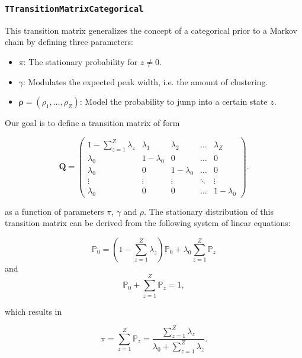 \documentclass[a4paper,11pt]{article}
\def\Q{\boldsymbol{Q}}
\def\brho{\boldsymbol{\rho}}
\def\p{\mathbb{P}}
\newcommand{\class}[1]{\texttt{#1}}
\begin{document}
\subsubsection{\class{TTransitionMatrixCategorical}}\label{section:TTransitionMatrixCategorical}
This transition matrix generalizes the concept of a categorical prior to a Markov chain by defining three parameters:
\begin{itemize}
 \item $\pi$: The stationary probability for $z \neq 0$.
 \item $\gamma$: Modulates the expected peak width, i.e. the amount of clustering.
 \item $\brho = (\rho_1, \ldots, \rho_Z)$: Model the probability to jump into a certain state $z$.
\end{itemize}

Our goal is to define a transition matrix of form

\begin{equation*}
 \Q = \begin{pmatrix}
  1 - \sum_{z=1}^Z \lambda_z & \lambda_1 & \lambda_2 & \ldots & \lambda_Z \\
  \lambda_0 & 1 - \lambda_0 & 0 & \ldots & 0 \\
  \lambda_0 & 0 & 1 - \lambda_0 & \ldots & 0 \\
  \vdots & \vdots & \vdots & \ddots & \vdots \\
  \lambda_0 & 0 & 0 & \ldots & 1 - \lambda_0
\end{pmatrix} .
\end{equation*}

as a function of parameters $\pi$, $\gamma$ and $\rho$. The stationary distribution of this transition matrix can be derived from the following system of linear equations:

\begin{equation*}
 \p_0 = \left( 1 - \sum_{z=1}^Z \lambda_z \right) \p_0 + \lambda_0 \sum_{z=1}^Z \p_z
 \end{equation*}
and
 \begin{equation*}
 \p_0 + \sum_{z=1}^Z \p_z = 1,
\end{equation*}

which results in

\begin{equation}\label{eq:la0pi}
 \pi = \sum_{z=1}^Z \p_z = \frac{\sum_{z=1}^Z \lambda_z}{\lambda_0 + \sum_{z=1}^Z \lambda_z}.
\end{equation}
\end{document}
